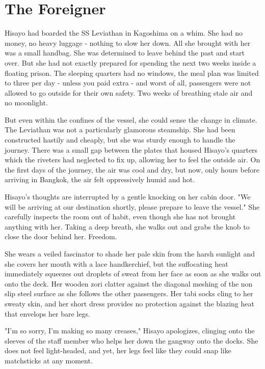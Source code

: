 \chapter{The Foreigner}

Hisayo had boarded the SS Leviathan in Kagoshima on a whim.
She had no money, no heavy luggage - nothing to slow her down.
All she brought with her was a small handbag.
She was determined to leave behind the past and start over.
But she had not exactly prepared for spending the next two weeks inside a floating prison.
The sleeping quarters had no windows, the meal plan was limited to three per day - unless you paid extra - and worst of all, passengers were not allowed to go outside for their own safety.
Two weeks of breathing stale air and no moonlight.

But even within the confines of the vessel, she could sense the change in climate.
The Leviathan was not a particularly glamorous steamship.
She had been constructed hastily and cheaply, but she was sturdy enough to handle the journey.
There was a small gap between the plates that housed Hisayo's quarters which the riveters had neglected to fix up, allowing her to feel the outside air.
On the first days of the journey, the air was cool and dry, but now, only hours before arriving in Bangkok, the air felt oppressively humid and hot.

Hisayo's thoughts are interrupted by a gentle knocking on her cabin door.
"We will be arriving at our destination shortly, please prepare to leave the vessel."
She carefully inspects the room out of habit, even though she has not brought anything with her.
Taking a deep breath, she walks out and grabs the knob to close the door behind her.
Freedom.

She wears a veiled fascinator to shade her pale skin from the harsh sunlight and she covers her mouth with a lace handkerchief, but the suffocating heat immediately squeezes out droplets of sweat from her face as soon as she walks out onto the deck.
Her wooden zori clatter against the diagonal meshing of the non slip steel surface as she follows the other passengers.
Her tabi socks cling to her sweaty skin, and her short dress provides no protection against the blazing heat that envelops her bare legs.

"I'm so sorry, I'm making so many creases," Hisayo apologizes, clinging onto the sleeves of the staff member who helps her down the gangway onto the docks.
She does not feel light-headed, and yet, her legs feel like they could snap like matchsticks at any moment.

